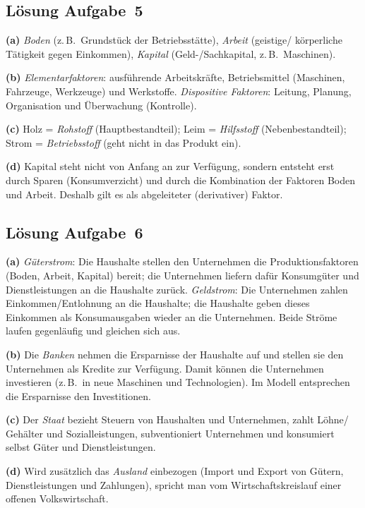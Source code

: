 \documentclass[11pt, a4paper]{article}
\begin{document}
\subsection*{Lösung Aufgabe~5}
\begin{loesung}
\textbf{(a)} \emph{Boden} (z.\,B.\ Grundstück der Betriebsstätte), \emph{Arbeit} (geistige/
körperliche Tätigkeit gegen Einkommen), \emph{Kapital} (Geld-/Sachkapital, z.\,B.\ Maschinen).

\textbf{(b)} \emph{Elementarfaktoren}: ausführende Arbeitskräfte, Betriebsmittel (Maschinen,
Fahrzeuge, Werkzeuge) und Werkstoffe. \emph{Dispositive Faktoren}: Leitung, Planung,
Organisation und Überwachung (Kontrolle).

\textbf{(c)} Holz = \emph{Rohstoff} (Hauptbestandteil); Leim = \emph{Hilfsstoff}
(Nebenbestandteil); Strom = \emph{Betriebsstoff} (geht nicht in das Produkt ein).

\textbf{(d)} Kapital steht nicht von Anfang an zur Verfügung, sondern entsteht erst durch
Sparen (Konsumverzicht) und durch die Kombination der Faktoren Boden und Arbeit. Deshalb
gilt es als abgeleiteter (derivativer) Faktor.
\end{loesung}

\subsection*{Lösung Aufgabe~6}
\begin{loesung}
\textbf{(a)} \emph{Güterstrom}: Die Haushalte stellen den Unternehmen die
Produktionsfaktoren (Boden, Arbeit, Kapital) bereit; die Unternehmen liefern dafür
Konsumgüter und Dienstleistungen an die Haushalte zurück. \emph{Geldstrom}: Die Unternehmen
zahlen Einkommen/Entlohnung an die Haushalte; die Haushalte geben dieses Einkommen als
Konsumausgaben wieder an die Unternehmen. Beide Ströme laufen gegenläufig und gleichen sich
aus.

\textbf{(b)} Die \emph{Banken} nehmen die Ersparnisse der Haushalte auf und stellen sie den
Unternehmen als Kredite zur Verfügung. Damit können die Unternehmen investieren (z.\,B.\ in
neue Maschinen und Technologien). Im Modell entsprechen die Ersparnisse den Investitionen.

\textbf{(c)} Der \emph{Staat} bezieht Steuern von Haushalten und Unternehmen, zahlt Löhne/
Gehälter und Sozialleistungen, subventioniert Unternehmen und konsumiert selbst Güter und
Dienstleistungen.

\textbf{(d)} Wird zusätzlich das \emph{Ausland} einbezogen (Import und Export von Gütern,
Dienstleistungen und Zahlungen), spricht man vom Wirtschaftskreislauf einer offenen
Volkswirtschaft.
\end{loesung}
\end{document}
